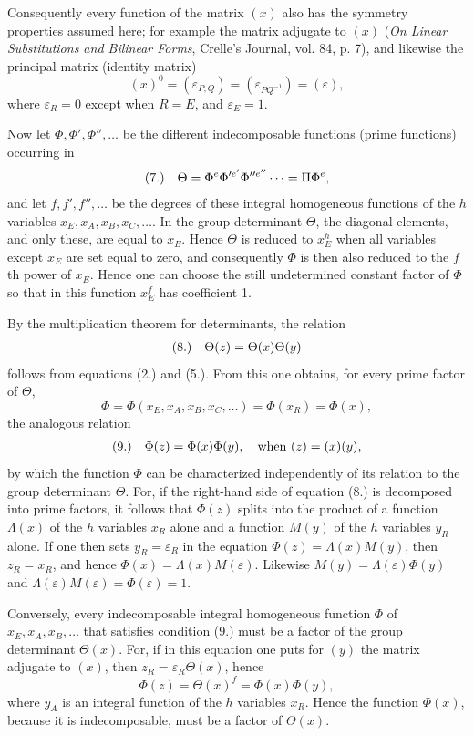 \documentclass[11pt]{article}
\makeatletter
\newcommand{\frobtagc}[2]{\[\begin{array}{@{}r@{\quad}c@{}}\textup{(#1)} & \displaystyle #2\end{array}\]}
\makeatother
\begin{document}
Consequently every function of the matrix $(x)$ also has the symmetry properties assumed here; for example the matrix adjugate to $(x)$ (\emph{On Linear Substitutions and Bilinear Forms}, Crelle's Journal, vol. 84, p. 7), and likewise the principal matrix (identity matrix)
\[
(x)^0=(\varepsilon_{P,Q})=(\varepsilon_{PQ^{-1}})=(\varepsilon),
\]
where $\varepsilon_R=0$ except when $R=E$, and $\varepsilon_E=1$.

Now let $\Phi,\Phi',\Phi'',\ldots$ be the different indecomposable functions (prime functions) occurring in
\frobtagc{7.}{\Theta=\Phi^e\Phi'^{e'}\Phi''^{e''}\cdots=\Pi\Phi^e,}
and let $f,f',f'',\ldots$ be the degrees of these integral homogeneous functions of the $h$ variables $x_E,x_A,x_B,x_C,\ldots$. In the group determinant $\Theta$, the diagonal elements, and only these, are equal to $x_E$. Hence $\Theta$ is reduced to $x_E^h$ when all variables except $x_E$ are set equal to zero, and consequently $\Phi$ is then also reduced to the $f$th power of $x_E$. Hence one can choose the still undetermined constant factor of $\Phi$ so that in this function $x_E^f$ has coefficient 1.

By the multiplication theorem for determinants, the relation
\frobtagc{8.}{\Theta(z)=\Theta(x)\Theta(y)}
follows from equations (2.) and (5.). From this one obtains, for every prime factor of $\Theta$,
\[
\Phi=\Phi(x_E,x_A,x_B,x_C,\ldots)=\Phi(x_R)=\Phi(x),
\]
the analogous relation
\frobtagc{9.}{\Phi(z)=\Phi(x)\Phi(y),\quad \text{when }(z)=(x)(y),}
by which the function $\Phi$ can be characterized independently of its relation to the group determinant $\Theta$. For, if the right-hand side of equation (8.) is decomposed into prime factors, it follows that $\Phi(z)$ splits into the product of a function $\Lambda(x)$ of the $h$ variables $x_R$ alone and a function $M(y)$ of the $h$ variables $y_R$ alone. If one then sets $y_R=\varepsilon_R$ in the equation $\Phi(z)=\Lambda(x)M(y)$, then $z_R=x_R$, and hence $\Phi(x)=\Lambda(x)M(\varepsilon)$. Likewise $M(y)=\Lambda(\varepsilon)\Phi(y)$ and $\Lambda(\varepsilon)M(\varepsilon)=\Phi(\varepsilon)=1$.

Conversely, every indecomposable integral homogeneous function $\Phi$ of $x_E,x_A,x_B,\ldots$ that satisfies condition (9.) must be a factor of the group determinant $\Theta(x)$. For, if in this equation one puts for $(y)$ the matrix adjugate to $(x)$, then $z_R=\varepsilon_R\Theta(x)$, hence
\[
\Phi(z)=\Theta(x)^f=\Phi(x)\Phi(y),
\]
where $y_A$ is an integral function of the $h$ variables $x_R$. Hence the function $\Phi(x)$, because it is indecomposable, must be a factor of $\Theta(x)$.
\end{document}
